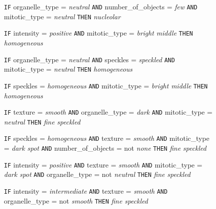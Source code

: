 \begin{figure}
\begin{algorithmic}[1]
			\State \texttt{IF} organelle\_type = \textit{neutral} \texttt{AND} number\_of\_objects = \textit{few} \texttt{AND} mitotic\_type = \textit{neutral}
			\Statex \texttt{THEN} \textit{nucleolar}
			
			\State \texttt{IF} intensity = \textit{positive} \texttt{AND} mitotic\_type = \textit{bright middle}
			\Statex \texttt{THEN} \textit{homogeneous}
			
			\State \texttt{IF} organelle\_type = \textit{neutral} \texttt{AND} speckles = \textit{speckled} \texttt{AND} mitotic\_type = \textit{neutral}
			\Statex \texttt{THEN} \textit{homogeneous}
			
			\State \texttt{IF} speckles = \textit{homogeneous} \texttt{AND} mitotic\_type = \textit{bright middle}
			\Statex \texttt{THEN} \textit{homogeneous}
			
			\State \texttt{IF} texture = \textit{smooth} \texttt{AND} organelle\_type = \textit{dark} \texttt{AND} mitotic\_type = \textit{neutral}
			\Statex \texttt{THEN} \textit{fine speckled}
			
			\State \texttt{IF} speckles = \textit{homogeneous} \texttt{AND} texture = \textit{smooth} \texttt{AND} mitotic\_type = \textit{dark spot} \texttt{AND} number\_of\_objects = not \textit{none}
			\Statex \texttt{THEN} \textit{fine speckled}
			
			\State \texttt{IF} intensity = \textit{positive} \texttt{AND} texture = \textit{smooth} \texttt{AND} mitotic\_type = \textit{dark spot} \texttt{AND} organelle\_type = not \textit{neutral}
			\Statex \texttt{THEN} \textit{fine speckled}
			
			\State \texttt{IF} intensity = \textit{intermediate} \texttt{AND} texture = \textit{smooth}  \texttt{AND} organelle\_type = not \textit{smooth}
			\Statex \texttt{THEN} \textit{fine speckled}
			
		\end{algorithmic}
	
\end{figure}


